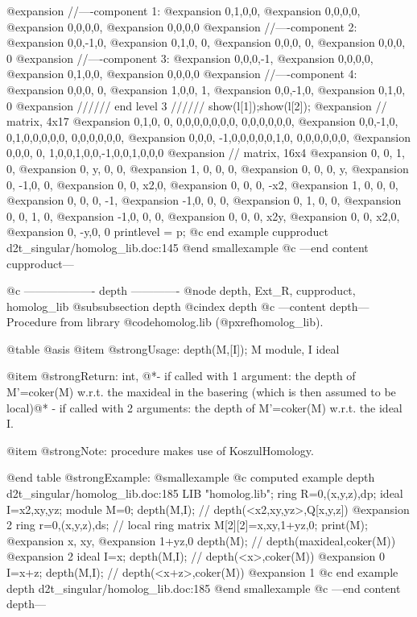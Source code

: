 @expansion{} //----component 1:
@expansion{} 0,1,0,0,
@expansion{} 0,0,0,0,
@expansion{} 0,0,0,0,
@expansion{} 0,0,0,0 
@expansion{} //----component 2:
@expansion{} 0,0,-1,0,
@expansion{} 0,1,0, 0,
@expansion{} 0,0,0, 0,
@expansion{} 0,0,0, 0 
@expansion{} //----component 3:
@expansion{} 0,0,0,-1,
@expansion{} 0,0,0,0, 
@expansion{} 0,1,0,0, 
@expansion{} 0,0,0,0  
@expansion{} //----component 4:
@expansion{} 0,0,0, 0,
@expansion{} 1,0,0, 1,
@expansion{} 0,0,-1,0,
@expansion{} 0,1,0, 0 
@expansion{} ////// end level 3 //////
show(l[1]);show(l[2]);
@expansion{} // matrix, 4x17
@expansion{} 0,1,0, 0, 0,0,0,0,0,0,0, 0,0,0,0,0,0,
@expansion{} 0,0,-1,0, 0,1,0,0,0,0,0, 0,0,0,0,0,0,
@expansion{} 0,0,0, -1,0,0,0,0,0,1,0, 0,0,0,0,0,0,
@expansion{} 0,0,0, 0, 1,0,0,1,0,0,-1,0,0,1,0,0,0 
@expansion{} // matrix, 16x4
@expansion{} 0, 0, 1, 0,  
@expansion{} 0, y, 0, 0,  
@expansion{} 1, 0, 0, 0,  
@expansion{} 0, 0, 0, y,  
@expansion{} 0, -1,0, 0,  
@expansion{} 0, 0, x2,0,  
@expansion{} 0, 0, 0, -x2,
@expansion{} 1, 0, 0, 0,  
@expansion{} 0, 0, 0, -1, 
@expansion{} -1,0, 0, 0,  
@expansion{} 0, 1, 0, 0,  
@expansion{} 0, 0, 1, 0,  
@expansion{} -1,0, 0, 0,  
@expansion{} 0, 0, 0, x2y,
@expansion{} 0, 0, x2,0,  
@expansion{} 0, -y,0, 0   
printlevel = p;
@c end example cupproduct d2t_singular/homolog_lib.doc:145
@end smallexample
@c ---end content cupproduct---

@c ------------------- depth -------------
@node depth, Ext_R, cupproduct, homolog_lib
@subsubsection depth
@cindex depth
@c ---content depth---
Procedure from library @code{homolog.lib} (@pxref{homolog_lib}).

@table @asis
@item @strong{Usage:}
depth(M,[I]); M module, I ideal

@item @strong{Return:}
int,
@*- if called with 1 argument: the depth of M'=coker(M) w.r.t. the
maxideal in the basering (which is then assumed to be local)@*
- if called with 2 arguments: the depth of M'=coker(M) w.r.t. the
ideal I.

@item @strong{Note:}
procedure makes use of KoszulHomology.

@end table
@strong{Example:}
@smallexample
@c computed example depth d2t_singular/homolog_lib.doc:185 
LIB "homolog.lib";
ring R=0,(x,y,z),dp;
ideal I=x2,xy,yz;
module M=0;
depth(M,I);   // depth(<x2,xy,yz>,Q[x,y,z])
@expansion{} 2
ring r=0,(x,y,z),ds;  // local ring
matrix M[2][2]=x,xy,1+yz,0;
print(M);
@expansion{} x,   xy,
@expansion{} 1+yz,0  
depth(M);     // depth(maxideal,coker(M))
@expansion{} 2
ideal I=x;
depth(M,I);   // depth(<x>,coker(M))
@expansion{} 0
I=x+z;
depth(M,I);   // depth(<x+z>,coker(M))
@expansion{} 1
@c end example depth d2t_singular/homolog_lib.doc:185
@end smallexample
@c ---end content depth---

